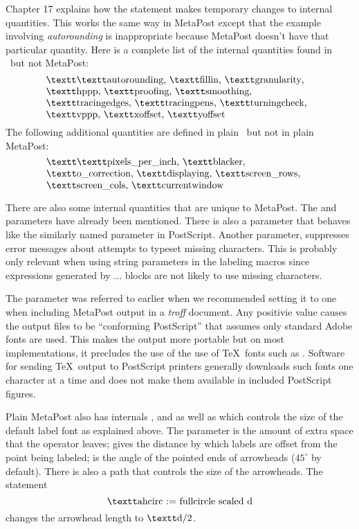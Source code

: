 Chapter 17 explains how the  statement makes temporary changes
to internal quantities.  This works the same way in MetaPost except that
the example involving {\it autorounding} is inappropriate because MetaPost
doesn't have that particular quantity.  Here is a complete list of the
internal quantities found in \MF\ but not MetaPost:
$$\vcenter{\hsize=.8\hsize \raggedright \multiply\rightskip by3 \textt\noindent
	\lit{autorounding}, \lit{fillin}, \lit{granularity}, \lit{hppp},
	\lit{proofing}, \lit{smoothing}, \lit{tracingedges},
	\lit{tracingpens}, \lit{turningcheck}, \lit{vppp}, \lit{xoffset},
	\lit{yoffset}}
$$
The following additional quantities are defined in plain \MF\ but not in
plain MetaPost:
$$\vcenter{\hsize=.8\hsize \raggedright \multiply\rightskip by3 \textt\noindent
	\lit{pixels\_per\_inch}, \lit{blacker}, \lit{o\_correction},
	\lit{displaying}, \lit{screen\_rows}, \lit{screen\_cols},
	\lit{currentwindow}}
$$

There are also some internal quantities that are unique to MetaPost.
The  and  parameters have already been mentioned.
There is also a  parameter that behaves like the similarly
named parameter in PostScript.  Another parameter, 
suppresses error messages about attempts to typeset missing characters.
This is probably only relevant when using string parameters in the labeling
macros since expressions generated by  $\ldots$ 
blocks are not likely to use missing characters.

The  parameter was referred to earlier when we recommended
setting it to one when including MetaPost output in a {\it troff\/} document.
Any positivie value causes the output files to be ``conforming PostScript''
that assumes only standard Adobe fonts are used.  This makes the output
more portable but on most implementations, it precludes the use of the use
of \TeX\ fonts such as .  Software for sending \TeX\ output to
PostScript printers generally downloads such fonts one character at a time
and does not make them available in included PostScript figures.

Plain MetaPost also has
internals ,  and 
as well as  which controls the size of the default label
font as explained above.  The  parameter is the amount of
extra space that the  operator leaves;  gives the
distance by which labels are offset from the point being labeled;
 is the angle of the pointed ends of arrowheads
($45^\circ$ by default).  There is also a path  that controls
the size of the arrowheads.  The statement
$$ \lit{ahcirc := fullcircle scaled d} $$
changes the arrowhead length to $\lit{d}/2$.

